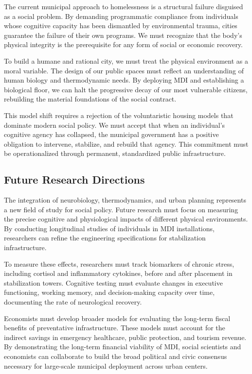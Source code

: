 \documentclass[12pt]{article}
\begin{document}
The current municipal approach to homelessness is a structural failure disguised as a social problem. By demanding programmatic compliance from individuals whose cognitive capacity has been dismantled by environmental trauma, cities guarantee the failure of their own programs. We must recognize that the body's physical integrity is the prerequisite for any form of social or economic recovery.

To build a humane and rational city, we must treat the physical environment as a moral variable. The design of our public spaces must reflect an understanding of human biology and thermodynamic needs. By deploying MDI and establishing a biological floor, we can halt the progressive decay of our most vulnerable citizens, rebuilding the material foundations of the social contract.

This model shift requires a rejection of the voluntaristic housing models that dominate modern social policy. We must accept that when an individual's cognitive agency has collapsed, the municipal government has a positive obligation to intervene, stabilize, and rebuild that agency. This commitment must be operationalized through permanent, standardized public infrastructure.

\subsection{Future Research Directions}
The integration of neurobiology, thermodynamics, and urban planning represents a new field of study for social policy. Future research must focus on measuring the precise cognitive and physiological impacts of different physical environments. By conducting longitudinal studies of individuals in MDI installations, researchers can refine the engineering specifications for stabilization infrastructure.

To measure these effects, researchers must track biomarkers of chronic stress, including cortisol and inflammatory cytokines, before and after placement in stabilization towers. Cognitive testing must evaluate changes in executive functioning, working memory, and decision-making capacity over time, documenting the rate of neurological recovery.

Economists must develop broader models for evaluating the long-term fiscal benefits of preventative infrastructure. These models must account for the indirect savings in emergency healthcare, public protection, and tourism revenue. By demonstrating the long-term financial viability of MDI, social scientists and economists can collaborate to build the broad political and civic consensus necessary for large-scale municipal deployment across urban centers.
\end{document}
